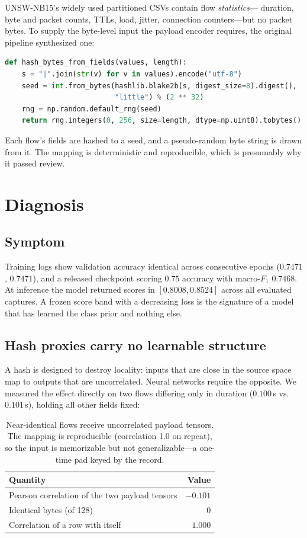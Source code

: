 \documentclass[11pt]{article}
\begin{document}
UNSW-NB15's widely used partitioned CSVs contain flow \emph{statistics}---
duration, byte and packet counts, TTLs, load, jitter, connection counters---but
no packet bytes. To supply the byte-level input the payload encoder requires,
the original pipeline synthesized one:

\begin{lstlisting}[language=Python]
def hash_bytes_from_fields(values, length):
    s = "|".join(str(v) for v in values).encode("utf-8")
    seed = int.from_bytes(hashlib.blake2b(s, digest_size=8).digest(),
                          "little") % (2 ** 32)
    rng = np.random.default_rng(seed)
    return rng.integers(0, 256, size=length, dtype=np.uint8).tobytes()
\end{lstlisting}

Each flow's fields are hashed to a seed, and a pseudo-random byte string is
drawn from it. The mapping is deterministic and reproducible, which is presumably
why it passed review.

\section{Diagnosis}
\label{sec:diagnosis}

\subsection{Symptom}

Training logs show validation accuracy identical across consecutive epochs
($0.7471$, $0.7471$), and a released checkpoint scoring $0.75$ accuracy with
macro-$F_1$ $0.7468$. At inference the model returned scores in
$[0.8008, 0.8524]$ across all evaluated captures. A frozen score band with a
decreasing loss is the signature of a model that has learned the class prior and
nothing else.

\subsection{Hash proxies carry no learnable structure}

A hash is designed to destroy locality: inputs that are close in the source
space map to outputs that are uncorrelated. Neural networks require the
opposite. We measured the effect directly on two flows differing only in
duration ($0.100$\,s vs.\ $0.101$\,s), holding all other fields fixed:

\begin{table}[h]
\centering
\begin{tabular}{lr}
\toprule
Quantity & Value \\
\midrule
Pearson correlation of the two payload tensors & $-0.101$ \\
Identical bytes (of 128) & $0$ \\
Correlation of a row with itself & $1.000$ \\
\bottomrule
\end{tabular}
\caption{Near-identical flows receive uncorrelated payload tensors. The mapping
is reproducible (correlation 1.0 on repeat), so the input is memorizable but not
generalizable---a one-time pad keyed by the record.}
\label{tab:hash}
\end{table}
\end{document}
